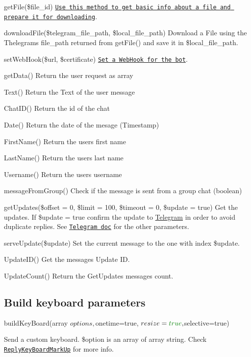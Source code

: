 \begin{DoxyItemize}
\item get\+File(\$file\+\_\+id) \href{https://core.telegram.org/bots/api#getfile}{\tt Use this method to get basic info about a file and prepare it for downloading}.
\item download\+File(\$telegram\+\_\+file\+\_\+path, \$local\+\_\+file\+\_\+path) Download a File using the Thelegram\textquotesingle{}s file\+\_\+path returned from get\+File() and save it in \$local\+\_\+file\+\_\+path.
\item set\+Web\+Hook(\$url, \$certificate) \href{https://core.telegram.org/bots/api#setwebhook}{\tt Set a Web\+Hook for the bot}.
\item get\+Data() Return the user request as array
\item Text() Return the Text of the user message
\item Chat\+I\+D() Return the id of the chat
\item Date() Return the date of the mesage (Timestamp)
\item First\+Name() Return the user\textquotesingle{}s first name
\item Last\+Name() Return the user\textquotesingle{}s last name
\item Username() Return the user\textquotesingle{}s username
\item message\+From\+Group() Check if the message is sent from a group chat (boolean)
\item get\+Updates(\$offset = 0, \$limit = 100, \$timeout = 0, \$update = true) Get the updates. If \$update = true confirm the update to \hyperlink{class_telegram}{Telegram} in order to avoid duplicate replies. See \href{https://core.telegram.org/bots/api#getting-updates}{\tt Telegram doc} for the other parameters.
\item serve\+Update(\$update) Set the current message to the one with index \$update.
\item Update\+I\+D() Get the message\textquotesingle{}s Update I\+D.
\item Update\+Count() Return the Get\+Updates messages count.
\end{DoxyItemize}

\subsection*{Build keyboard parameters }


\begin{DoxyCode}
buildKeyBoard(array $options, $onetime=\textcolor{keyword}{true}, $resize=\textcolor{keyword}{true}, $selective=\textcolor{keyword}{true})
\end{DoxyCode}
 Send a custom keyboard. \$option is an array of array string. Check \href{https://core.telegram.org/bots/api#replykeyboardmarkup}{\tt Reply\+Key\+Board\+Mark\+Up} for more info.


